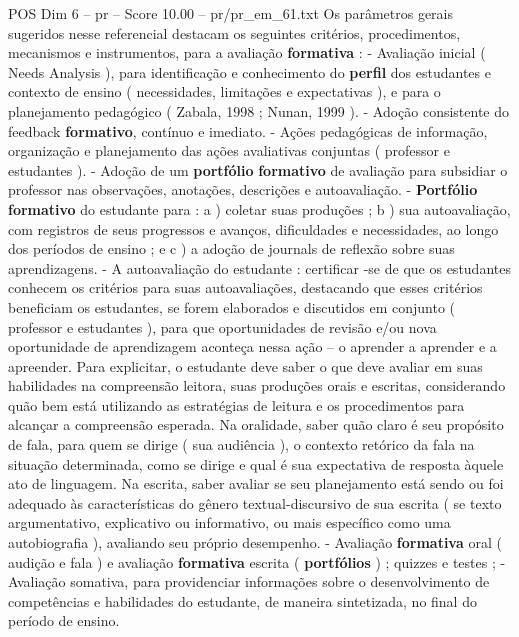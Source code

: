 \begin{textsample}{POS Dim 6 – pr – Score 10.00 – pr/pr\_em\_61.txt}
Os parâmetros gerais sugeridos nesse referencial destacam os seguintes critérios, procedimentos, mecanismos e instrumentos, para a avaliação \textbf{formativa} : - Avaliação inicial ( Needs Analysis ), para identificação e conhecimento do \textbf{perfil} dos estudantes e contexto de ensino ( necessidades, limitações e expectativas ), e para o planejamento pedagógico ( Zabala, 1998 ; Nunan, 1999 ). - Adoção consistente do feedback \textbf{formativo}, contínuo e imediato. - Ações pedagógicas de informação, organização e planejamento das ações avaliativas conjuntas ( professor e estudantes ). - Adoção de um \textbf{portfólio} \textbf{formativo} de avaliação para subsidiar o professor nas observações, anotações, descrições e autoavaliação. - \textbf{Portfólio} \textbf{formativo} do estudante para : a ) coletar suas produções ; b ) sua autoavaliação, com registros de seus progressos e avanços, dificuldades e necessidades, ao longo dos períodos de ensino ; e c ) a adoção de journals de reflexão sobre suas aprendizagens. - A autoavaliação do estudante : certificar -se de que os estudantes conhecem os critérios para suas autoavaliações, destacando que esses critérios beneficiam os estudantes, se forem elaborados e discutidos em conjunto ( professor e estudantes ), para que oportunidades de revisão e/ou nova oportunidade de aprendizagem aconteça nessa ação – o aprender a aprender e a apreender.
Para explicitar, o estudante deve saber o que deve avaliar em suas habilidades na compreensão leitora, suas produções orais e escritas, considerando quão bem está utilizando as estratégias de leitura e os procedimentos para alcançar a compreensão esperada.
Na oralidade, saber quão claro é seu propósito de fala, para quem se dirige ( sua audiência ), o contexto retórico da fala na situação determinada, como se dirige e qual é sua expectativa de resposta àquele ato de linguagem.
Na escrita, saber avaliar se seu planejamento está sendo ou foi adequado às características do gênero textual-discursivo de sua escrita ( se texto argumentativo, explicativo ou informativo, ou mais específico como uma autobiografia ), avaliando seu próprio desempenho. - Avaliação \textbf{formativa} oral ( audição e fala ) e avaliação \textbf{formativa} escrita ( \textbf{portfólios} ) ; quizzes e testes ; - Avaliação somativa, para providenciar informações sobre o desenvolvimento de competências e habilidades do estudante, de maneira sintetizada, no final do período de ensino.

\end{textsample}
